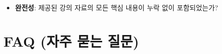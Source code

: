\documentclass[11pt,a4paper]{article}
\theoremstyle{definition}
\begin{document}
\begin{tcolorbox}[title=\textbf{학습/작성/검토 체크리스트}, colback=myblue!10, colframe=blue!75!black, boxrule=0.8pt, arc=4pt]
\begin{itemize}
\begin{itemize}
        \item '왜 이런 개념이 필요한가'에 대한 배경 설명이 포함되었는가?
        \item 모를 수 있는 포인트를 예측하여 미리 설명되었는가?
        \item 문맥 의존 표현 없이 문장 자체로 의미가 통하는가?
        \item 개념 간 비교표(필요시)가 추가되었는가?
    \end{itemize}
    \item \textbf{완전성}: 제공된 강의 자료의 모든 핵심 내용이 누락 없이 포함되었는가?
\end{itemize}
\end{tcolorbox}

\newpage
\section*{FAQ (자주 묻는 질문)}
\end{document}
